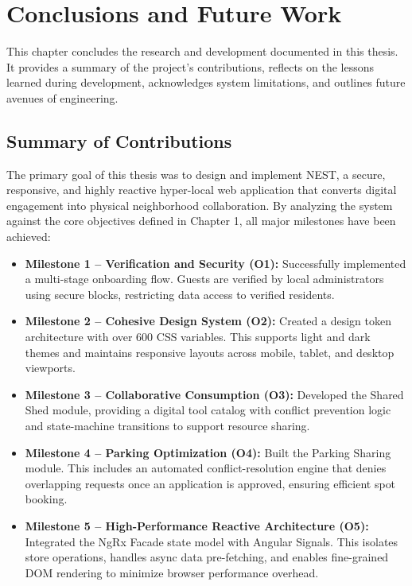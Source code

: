 \chapter{Conclusions and Future Work}
\label{chap:conclusions-future-work}

This chapter concludes the research and development documented in this thesis. It provides a summary of the project's contributions, reflects on the lessons learned during development, acknowledges system limitations, and outlines future avenues of engineering.

\section{Summary of Contributions}
The primary goal of this thesis was to design and implement NEST, a secure, responsive, and highly reactive hyper-local web application that converts digital engagement into physical neighborhood collaboration. By analyzing the system against the core objectives defined in Chapter 1, all major milestones have been achieved:
\begin{itemize}
    \item \textbf{Milestone 1 -- Verification and Security (O1):} Successfully implemented a multi-stage onboarding flow. Guests are verified by local administrators using secure blocks, restricting data access to verified residents.
    \item \textbf{Milestone 2 -- Cohesive Design System (O2):} Created a design token architecture with over 600 CSS variables. This supports light and dark themes and maintains responsive layouts across mobile, tablet, and desktop viewports.
    \item \textbf{Milestone 3 -- Collaborative Consumption (O3):} Developed the Shared Shed module, providing a digital tool catalog with conflict prevention logic and state-machine transitions to support resource sharing.
    \item \textbf{Milestone 4 -- Parking Optimization (O4):} Built the Parking Sharing module. This includes an automated conflict-resolution engine that denies overlapping requests once an application is approved, ensuring efficient spot booking.
    \item \textbf{Milestone 5 -- High-Performance Reactive Architecture (O5):} Integrated the NgRx Facade state model with Angular Signals. This isolates store operations, handles async data pre-fetching, and enables fine-grained DOM rendering to minimize browser performance overhead.
\end{itemize}

